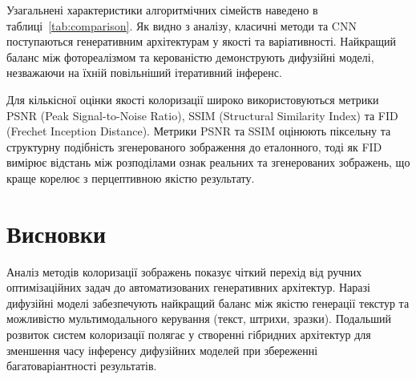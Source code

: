 \documentclass[]{iptconf}
\begin{document}
        Узагальнені характеристики алгоритмічних сімейств наведено в таблиці~\ref{tab:comparison}. Як видно з аналізу, класичні методи та CNN поступаються генеративним архітектурам у якості та варіативності. Найкращий баланс між фотореалізмом та керованістю демонструють дифузійні моделі, незважаючи на їхній повільніший ітеративний інференс.
		
		Для кількісної оцінки якості колоризації широко використовуються метрики PSNR (Peak Signal-to-Noise Ratio), SSIM (Structural Similarity Index) та FID (Frechet Inception Distance). Метрики PSNR та SSIM оцінюють піксельну та структурну подібність згенерованого зображення до еталонного, тоді як FID вимірює відстань між розподілами ознак реальних та згенерованих зображень, що краще корелює з перцептивною якістю результату.

	\section*{Висновки}
	
		Аналіз методів колоризації зображень показує чіткий перехід від ручних оптимізаційних задач до автоматизованих генеративних архітектур. Наразі дифузійні моделі забезпечують найкращий баланс між якістю генерації текстур та можливістю мультимодального керування (текст, штрихи, зразки). Подальший розвиток систем колоризації полягає у створенні гібридних архітектур для зменшення часу інференсу дифузійних моделей при збереженні багатоваріантності результатів.
	
\end{document}
